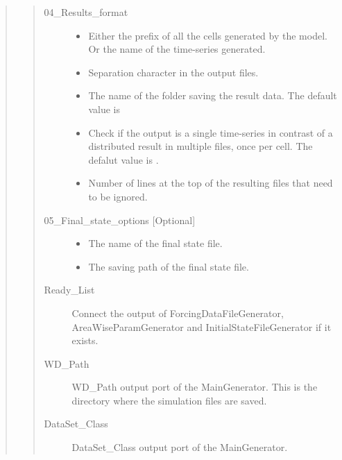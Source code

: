 \documentclass[letterpaper,10pt,english]{sphinxmanual}
\begin{document}
\begin{fulllineitems}
\begin{quote}
\begin{description}
\begin{quote}
\begin{description}
\item[{04\_Results\_format}] \leavevmode\begin{itemize}
\item {} 
 Either the prefix of all the cells generated by the model. Or the name of the time-series generated.

\item {} 
 Separation character in the output files.

\item {} 
 The name of the folder saving the result data. The default value is 

\item {} 
 Check if the output is a single time-series in contrast of a distributed result in multiple files, once per cell.  The defalut value is .

\item {} 
 Number of lines at the top of the resulting files that need to be ignored.

\end{itemize}

\item[{05\_Final\_state\_options {[}Optional{]}}] \leavevmode\begin{itemize}
\item {} 
 The name of the final state file.

\item {} 
 The saving path of the final state file.

\end{itemize}

\item[{Ready\_List}] \leavevmode
Connect the output of ForcingDataFileGenerator, AreaWiseParamGenerator and InitialStateFileGenerator if it exists.

\item[{WD\_Path}] \leavevmode
WD\_Path output port of the MainGenerator. This is the directory where the simulation files are saved.

\item[{DataSet\_Class}] \leavevmode
DataSet\_Class output port of the MainGenerator.

\end{description}\end{quote}


\end{description}
\end{quote}
\end{fulllineitems}
\end{document}
